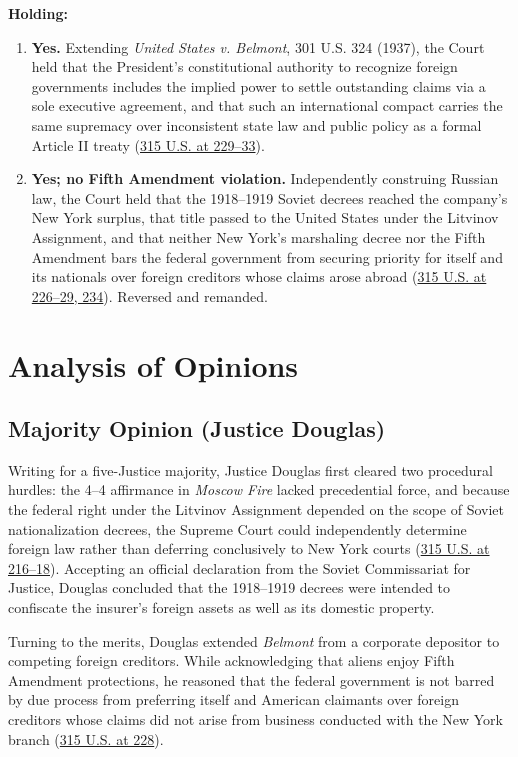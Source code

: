 \documentclass[12pt]{article}
\begin{document}
\textbf{Holding:}

\begin{enumerate}
  \item \textbf{Yes.} Extending \textit{United States v. Belmont}, 301 U.S. 324 (1937), the Court held that the President's constitutional authority to recognize foreign governments includes the implied power to settle outstanding claims via a sole executive agreement, and that such an international compact carries the same supremacy over inconsistent state law and public policy as a formal Article II treaty (\href{https://supreme.justia.com/cases/federal/us/315/203/}{315 U.S. at 229--33}).
  \item \textbf{Yes; no Fifth Amendment violation.} Independently construing Russian law, the Court held that the 1918--1919 Soviet decrees reached the company's New York surplus, that title passed to the United States under the Litvinov Assignment, and that neither New York's marshaling decree nor the Fifth Amendment bars the federal government from securing priority for itself and its nationals over foreign creditors whose claims arose abroad (\href{https://supreme.justia.com/cases/federal/us/315/203/}{315 U.S. at 226--29, 234}). Reversed and remanded.
\end{enumerate}

\section{Analysis of Opinions}
\subsection{Majority Opinion (Justice Douglas)}

Writing for a five-Justice majority, Justice Douglas first cleared two procedural hurdles: the 4--4 affirmance in \textit{Moscow Fire} lacked precedential force, and because the federal right under the Litvinov Assignment depended on the scope of Soviet nationalization decrees, the Supreme Court could independently determine foreign law rather than deferring conclusively to New York courts (\href{https://caselaw.findlaw.com/court/us-supreme-court/315/203.html}{315 U.S. at 216--18}). Accepting an official declaration from the Soviet Commissariat for Justice, Douglas concluded that the 1918--1919 decrees were intended to confiscate the insurer's foreign assets as well as its domestic property.

Turning to the merits, Douglas extended \textit{Belmont} from a corporate depositor to competing foreign creditors. While acknowledging that aliens enjoy Fifth Amendment protections, he reasoned that the federal government is not barred by due process from preferring itself and American claimants over foreign creditors whose claims did not arise from business conducted with the New York branch (\href{https://supreme.justia.com/cases/federal/us/315/203/}{315 U.S. at 228}).
\end{document}
